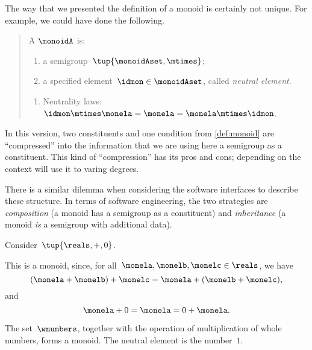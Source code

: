\begin{remark}
  The way that we presented the definition of a monoid is certainly not unique. For example, we could have done the following.

  \begin{quote}
    A \emph{} $\monoidA$ is:
    \begin{body}
      \constit
      \begin{enumerate}
        \item a semigroup~$\tup{\monoidAset, \mtimes}$;
        \item a specified element~$\idmon\in \monoidAset$, called \emph{neutral element}.
      \end{enumerate}
      \condit
      \begin{enumerate}
        \item Neutrality laws:~$\idmon\mtimes \monela= \monela= \monela \mtimes \idmon$.
      \end{enumerate}
    \end{body}
  \end{quote}
  In this version, two constituents and one condition from \cref{def:monoid} are ``compressed'' into the information that we are using here a semigroup as a constituent. This kind of ``compression'' has its pros and cons; depending on the context will use it to varing degrees.

  There is a similar dilemma when considering the software interfaces to describe these structure.
  In terms of software engineering, the two strategies are \emph{composition} (a monoid has a semigroup as a constituent)
  and \emph{inheritance} (a monoid \emph{is} a semigroup with additional data).

\end{remark}



\begin{example}
  Consider~$\tup{\reals,+,0}$.

  This is a monoid, since, for all~$\monela,\monelb, \monelc \in \reals$, we have
  \begin{equation*}
  (\monela+\monelb)+\monelc=\monela+(\monelb+\monelc),
  \end{equation*}
  and
  \begin{equation*}
    \monela+0=\monela=0+\monela.
  \end{equation*}
\end{example}

\begin{example}
  The set~$\wnumbers$, together with the operation of multiplication of whole numbers, forms a monoid.
  The neutral element is the number~$1$.
\end{example}

